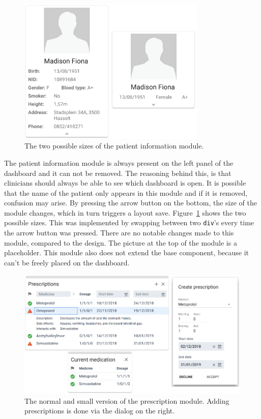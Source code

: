             \begin{figure}[t]
                \centering
                \includegraphics[width=0.8\textwidth]{chapters/4_implementation/patient-info}
                \caption{The two possible sizes of the patient information module.}\label{fig:patient-info}
            \end{figure}

            The patient information module is always present on the left panel of the dashboard and it can not be removed. The reasoning behind this, is that clinicians should always be able to see which dashboard is open. It is possible that the name of the patient only appears in this module and if it is removed, confusion may arise. By pressing the arrow button on the bottom, the size of the module changes, which in turn triggers a layout save. Figure~\ref{fig:patient-info} shows the two possible sizes. This was implemented by swapping between two \texttt{div}'s every time the arrow button was pressed. There are no notable changes made to this module, compared to the design. The picture at the top of the module is a placeholder. This module also does not extend the base component, because it can't be freely placed on the dashboard.


            \begin{figure}[t]
                \centering
                \includegraphics[width=1\textwidth]{chapters/4_implementation/prescriptions}
                \caption{The normal and small version of the prescription module. Adding prescriptions is done via the dialog on the right.}\label{fig:prescriptions}
            \end{figure}

